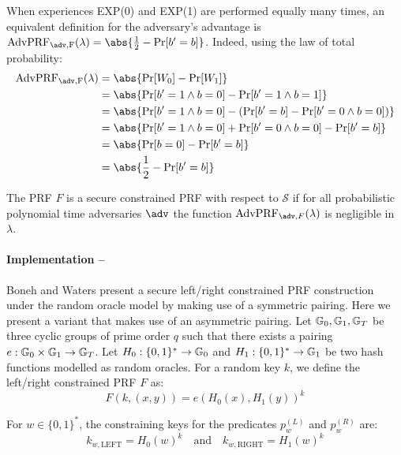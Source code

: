 		\noindent When experiences EXP(0) and EXP(1) are performed equally many times, an equivalent definition for the adversary's advantage is $\mathrm{AdvPRF_{\adv, F}}(\lambda) = \abs{\frac{1}{2} - \Pr[b' = b]}$. Indeed, using the law of total probability:
		\begin{align}
				\mathrm{AdvPRF_{\adv, F}}(\lambda) &= \abs{\mathrm{Pr}[W_0] - \mathrm{Pr}[W_1]} \\
				&= \abs{\Pr[b' = 1 \land b=0] - \Pr[b' = 1 \land b=1]} \\
				&= \abs{\Pr[b' = 1 \land b=0] - \left(\Pr[b' = b] - \Pr[b' = 0 \land b=0] \right)} \\
				&= \abs{\Pr[b' = 1 \land b=0] + \Pr[b' = 0 \land b=0] - \Pr[b' = b]}\\
				&= \abs{\Pr[b=0]- \Pr[b' = b]} \\
				&= \abs{\frac{1}{2} - \Pr[b' = b]}
			\end{align}
		
		\begin{definition}
		\label{def:lrPRFsec}
			The PRF $F$ is a secure constrained PRF with respect to $\mathcal{S}$ if for all probabilistic
polynomial time adversaries $\adv$ the function $\mathrm{AdvPRF}_{\adv,F}(\lambda)$ is negligible in $\lambda$.
		\end{definition}


\paragraph{Implementation --} \label{leftright} Boneh and Waters \cite{LRPRF} present a secure left/right constrained PRF construction under the random oracle model by making use of a symmetric pairing. Here we present a variant that makes use of an asymmetric pairing. Let $\mathbb{G}_0, \mathbb{G}_1, \mathbb{G}_T$ be three cyclic groups of prime order $q$ such that there exists a pairing $e : \mathbb{G}_0 \times \mathbb{G}_1 \rightarrow \mathbb{G}_T$. Let $H_0: \{0,1\}^* \rightarrow \mathbb{G}_0$ and $H_1: \{0,1\}^* \rightarrow \mathbb{G}_1$ be two hash functions modelled as random oracles. For a random key $k$, we define the left/right constrained PRF $F$ as:
\begin{equation}
	\label{eq:LRPRF}
	F(k, (x,y)) = e(H_0(x), H_1(y))^k
\end{equation}

For $w \in \{0,1\}^*$, the constraining keys for the predicates $p_w^{(L)}$ and  $p_w^{(R)}$ are:
\begin{equation}
\label{eq:constrkeys}
	k_{w,\mathrm{LEFT}} = H_0(w)^k \quad \mathrm{and} \quad k_{w,\mathrm{RIGHT}} = H_1(w)^k
\end{equation}

